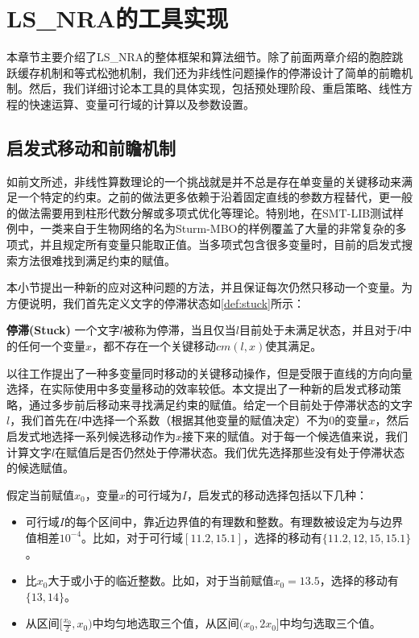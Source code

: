 \chapter{LS\_NRA的工具实现}\label{chap:implementation}

本章节主要介绍了LS\_NRA的整体框架和算法细节。除了前面两章介绍的胞腔跳跃缓存机制和等式松弛机制，我们还为非线性问题操作的停滞设计了简单的前瞻机制。然后，我们详细讨论本工具的具体实现，包括预处理阶段、重启策略、线性方程的快速运算、变量可行域的计算以及参数设置。

\section{启发式移动和前瞻机制}
如前文所述，非线性算数理论的一个挑战就是并不总是存在单变量的关键移动来满足一个特定的约束。之前的做法更多依赖于沿着固定直线的参数方程替代\cite{LiXZ23}，更一般的做法需要用到柱形代数分解或多项式优化等理论。特别地，在SMT-LIB测试样例中，一类来自于生物网络\cite{AkutsuHT08}的名为Sturm-MBO的样例覆盖了大量的非常复杂的多项式，并且规定所有变量只能取正值。当多项式包含很多变量时，目前的启发式搜索方法很难找到满足约束的赋值。

本小节提出一种新的应对这种问题的方法，并且保证每次仍然只移动一个变量。为方便说明，我们首先定义文字的停滞状态如\ref{def:stuck}所示：

\begin{definition}{\textbf{停滞(Stuck)}}
    一个文字$l$被称为停滞，当且仅当$l$目前处于未满足状态，并且对于$l$中的任何一个变量$x$，都不存在一个关键移动$cm(l, x)$使其满足。
\label{def:stuck}
\end{definition}

以往工作\cite{LiXZ23}提出了一种多变量同时移动的关键移动操作，但是受限于直线的方向向量选择，在实际使用中多变量移动的效率较低。本文提出了一种新的启发式移动策略，通过多步前后移动来寻找满足约束的赋值。给定一个目前处于停滞状态的文字$l$，我们首先在$l$中选择一个系数（根据其他变量的赋值决定）不为0的变量$x$，然后启发式地选择一系列候选移动作为$x$接下来的赋值。对于每一个候选值来说，我们计算文字$l$在赋值后是否仍然处于停滞状态。我们优先选择那些没有处于停滞状态的候选赋值。

假定当前赋值$x_0$，变量$x$的可行域为$I$，启发式的移动选择包括以下几种：
\begin{itemize}
    \item 可行域$I$的每个区间中，靠近边界值的有理数和整数。有理数被设定为与边界值相差$10^{-4}$。比如，对于可行域$[11.2, 15.1]$，选择的移动有$\{11.2, 12, 15, 15.1\}$。
    \item 比$x_0$大于或小于的临近整数。比如，对于当前赋值$x_0 = 13.5$，选择的移动有$\{13, 14\}$。
    \item 从区间$[\frac{x_0}{2}, x_0)$中均匀地选取三个值，从区间$(x_0, 2x_0]$中均匀选取三个值。
\label{en:look-ahead}
\end{itemize}

